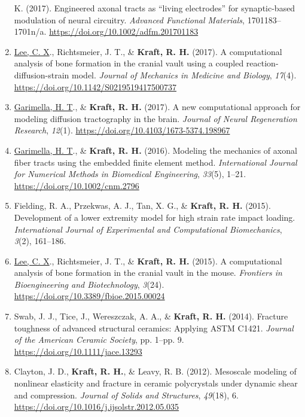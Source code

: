 \documentclass[11pt]{article}
\begin{document}
\begin{enumerate}
K. 
(2017). 
Engineered axonal tracts as
  ``living electrodes'' for synaptic-based modulation of neural circuitry.
  \emph{Advanced Functional Materials}, 1701183--1701n/a.
  \url{https://doi.org/10.1002/adfm.201701183}
\item
  \underline{Lee, C. 
X}., Richtsmeier, J. 
T., \& \textbf{\textbf{Kraft,} R. 
H.} (2017). 
A
  computational analysis of bone formation in the cranial vault using a
  coupled reaction-diffusion-strain model. 
\emph{Journal of Mechanics in
  Medicine and Biology}, \emph{17}(4).
  \url{https://doi.org/10.1142/S0219519417500737}
\item
  \underline{Garimella, H. 
T}., \& \textbf{\textbf{Kraft,} R. 
H.} (2017). 
A new computational approach
  for modeling diffusion tractography in the brain. 
\emph{Journal of
  Neural Regeneration Research}, \emph{12}(1).
  \url{https://doi.org/10.4103/1673-5374.198967}
\item
  \underline{Garimella, H. 
T}., \& \textbf{\textbf{Kraft,} R. 
H.} (2016). 
Modeling the mechanics of
  axonal fiber tracts using the embedded finite element method.
  \emph{International Journal for Numerical Methods in Biomedical
  Engineering}, \emph{33}(5), 1--21.
  \url{https://doi.org/10.1002/cnm.2796}
\item
  Fielding, R. 
A., Przekwas, A. 
J., Tan, X. 
G., \& \textbf{\textbf{Kraft,} R. 
H.} (2015).
  Development of a lower extremity model for high strain rate impact
  loading. 
\emph{International Journal of Experimental and Computational
  Biomechanics}, \emph{3}(2), 161--186.
\item
  \underline{Lee, C. 
X}., Richtsmeier, J. 
T., \& \textbf{\textbf{Kraft,} R. 
H.} (2015). 
A
  computational analysis of bone formation in the cranial vault in the
  mouse. 
\emph{Frontiers in Bioengineering and Biotechnology},
  \emph{3}(24). 
\url{https://doi.org/10.3389/fbioe.2015.00024}
\item
  Swab, J. 
J., Tice, J., Wereszczak, A. 
A., \& \textbf{\textbf{Kraft,} R. 
H.} (2014).
  Fracture toughness of advanced structural ceramics: Applying ASTM
  C1421. 
\emph{Journal of the American Ceramic Society}, pp. 
1--pp. 
9.
  \url{https://doi.org/10.1111/jace.13293}
\item
  Clayton, J. 
D., \textbf{\textbf{Kraft,} R. 
H.}, \& Leavy, R. 
B. 
(2012). 
Mesoscale
  modeling of nonlinear elasticity and fracture in ceramic polycrystals
  under dynamic shear and compression. 
\emph{Journal of Solids and
  Structures}, \emph{49}(18), 6.
  \url{https://doi.org/10.1016/j.ijsolstr.2012.05.035}

\end{enumerate}
\end{document}
